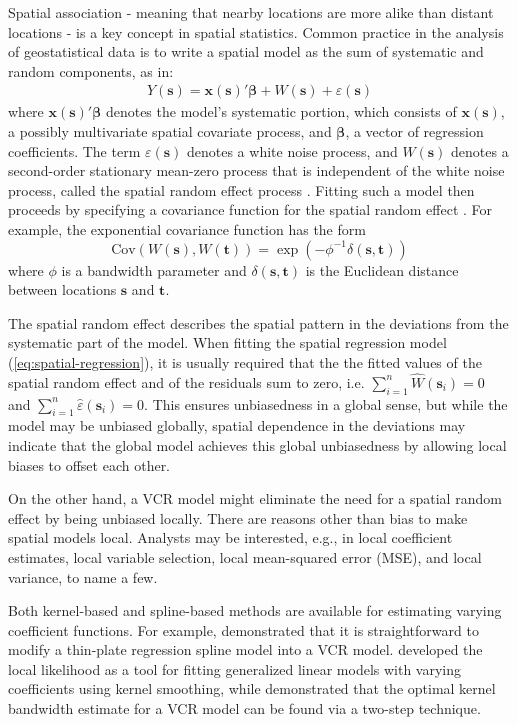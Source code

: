 \documentclass[authoryear, review, 11pt]{elsarticle}
\begin{document}
	Spatial association - meaning that nearby locations are more alike than distant locations - is a key concept in spatial statistics. Common practice in the analysis of geostatistical data is to write a spatial model as the sum of systematic and random components, as in: 
\begin{align}\label{eq:spatial-regression}
    Y(\bm{s}) = \bm{x}(\bm{s})'\bm{\beta} + W(\bm{s}) + \varepsilon(\bm{s})
\end{align}
where $\bm{x}(\bm{s})'\bm{\beta}$ denotes the model's systematic portion, which consists of $\bm{x}(\bm{s})$, a possibly multivariate spatial covariate process, and $\bm{\beta}$, a vector of regression coefficients. The term $\varepsilon(\bm{s})$ denotes a white noise process, and $W(\bm{s})$ denotes a second-order stationary mean-zero process that is independent of the white noise process, called the spatial random effect process \citep{Cressie:1993}. Fitting such a model then proceeds by specifying a covariance function for the spatial random effect \citep{Diggle:2007}. For example, the exponential covariance function has the form
\[
    \text{Cov}(W(\bm{s}), W(\bm{t})) = \exp\left(-\phi^{-1} \delta(\bm{s}, \bm{t}) \right)
\]
where $\phi$ is a bandwidth parameter and $\delta(\bm{s}, \bm{t})$ is the Euclidean distance between locations $\bm{s}$ and $\bm{t}$.

	The spatial random effect describes the spatial pattern in the deviations from the systematic part of the model. When fitting the spatial regression model (\ref{eq:spatial-regression}), it is usually required that the the fitted values of the spatial random effect and of the residuals sum to zero, i.e. $\sum\limits_{i=1}^n\hat{W}(\bm{s}_i) = 0$ and $\sum\limits_{i=1}^n\hat{\varepsilon}(\bm{s}_i) = 0$. This ensures unbiasedness in a global sense, but while the model may be unbiased globally, spatial dependence in the deviations may indicate that the global model achieves this global unbiasedness by allowing local biases to offset each other.

	On the other hand, a VCR model might eliminate the need for a spatial random effect by being unbiased locally. There are reasons other than bias to make spatial models local. Analysts may be interested, e.g., in local coefficient estimates, local variable selection, local mean-squared error (MSE), and local variance, to name a few.
	
	Both kernel-based and spline-based methods are available for estimating varying coefficient functions. For example, \cite{Wood:2006} demonstrated that it is straightforward to modify a thin-plate regression spline model into a VCR model. \cite{Loader:1999} developed the local likelihood as a tool for fitting generalized linear models with varying coefficients using kernel smoothing, while \cite{Fan:1999} demonstrated that the optimal kernel bandwidth estimate for a VCR model can be found via a two-step technique.
	
\end{document}
